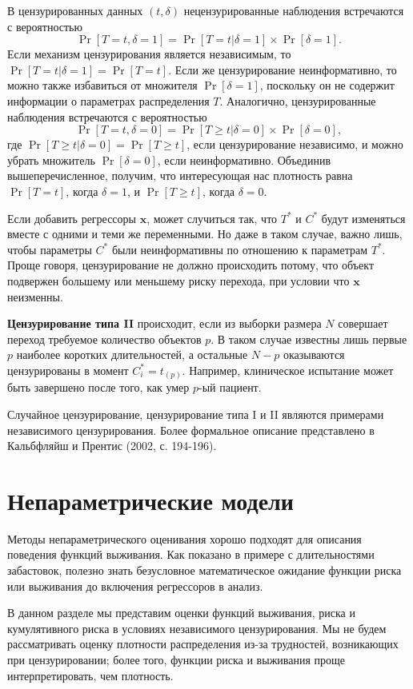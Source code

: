 В цензурированных данных $(t,\delta)$ нецензурированные наблюдения встречаются с вероятностью
    $$\Pr{[T=t,\delta=1]}=\Pr{[T=t|\delta=1]}\times\Pr{[\delta=1]}.$$
Если механизм цензурирования является независимым, то $\Pr{[T=t|\delta=1]}=\Pr{[T=t]}$. Если же цензурирование неинформативно, то можно также избавиться от множителя $\Pr{[\delta=1]}$, поскольку он не содержит информации о параметрах распределения $T$. Аналогично, цензурированные наблюдения встречаются с вероятностью
    $$\Pr{[T=t,\delta=0]}=\Pr{[T\ge t|\delta=0]}\times\Pr{[\delta=0]},$$
где $\Pr{[T\ge t|\delta=0]}=\Pr{[T\ge t]}$, если цензурирование независимо, и можно убрать множитель $\Pr{[\delta=0]}$, если неинформативно. Объединив вышеперечисленное, получим, что интересующая нас плотность равна $\Pr{[T=t]}$, когда $\delta=1$, и $\Pr{[T\ge t]}$, когда $\delta=0$.

Если добавить регрессоры $\mathbf{x}$, может случиться так, что $T^*$ и $C^*$ будут изменяться вместе с одними и теми же переменными. Но даже в таком случае, важно лишь, чтобы параметры $C^*$ были неинформативны по отношению к параметрам $T^*$. Проще говоря, цензурирование не должно происходить потому, что объект подвержен большему или меньшему риску перехода, при условии что $\mathbf{x}$ неизменны.

\textbf{Цензурирование типа II} происходит, если из выборки размера $N$ совершает переход требуемое количество объектов $p$. В таком случае известны лишь первые $p$ наиболее коротких длительностей, а остальные $N-p$ оказываются цензурированы в момент $C^*_i=t_{(p)}$. Например, клиническое испытание может быть завершено после того, как умер $p$-ый пациент.

Случайное цензурирование, цензурирование типа I и II являются примерами независимого цензурирования. Более формальное описание представлено в Кальбфляйш и Прентис (2002, с. 194-196).


\section{Непараметрические модели}\label{sec:17.5}

\noindent
Методы непараметрического оценивания хорошо подходят для описания поведения функций выживания. Как показано в примере с длительностями забастовок, полезно знать безусловное математическое ожидание функции риска или выживания до включения регрессоров в анализ.

В данном разделе мы представим оценки функций выживания, риска и кумулятивного риска в условиях независимого цензурирования. Мы не будем рассматривать оценку плотности распределения из-за трудностей, возникающих при цензурировании; более того, функции риска и выживания проще интерпретировать, чем плотность.


